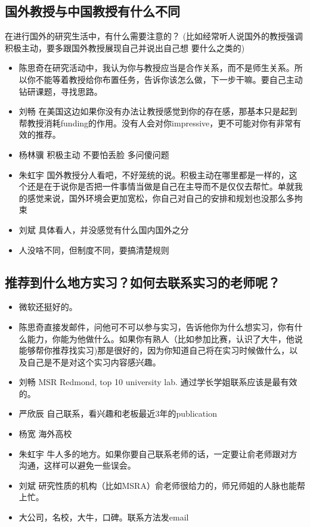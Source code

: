 \documentclass{vivid_layout}
\begin{document}
\subsection{国外教授与中国教授有什么不同}
在进行国外的研究生活中，有什么需要注意的？ (比如经常听人说国外的教授强调积极主动，要多跟国外教授展现自己并说出自己想 要什么之类的)
\begin{itemize}
\item { 陈思奇}\quad 在研究活动中，我认为你与教授应当是合作关系，而不是师生关系。所以你不能等着教授给你布置任务，告诉你该怎么做，下一步干嘛。要自己主动钻研课题，寻找思路。
\item  { 刘畅}  \quad 在美国这边如果你没有办法让教授感觉到你的存在感，那基本只是起到帮教授消耗funding的作用。没有人会对你impressive，更不可能对你有非常有效的推荐。
\item  { 杨林骥}  \quad 积极主动 不要怕丢脸 多问傻问题
\item  { 朱虹宇}  \quad 国外教授分人看吧，不好笼统的说。积极主动在哪里都是一样的，这个还是在于说你是否把一件事情当做是自己在主导而不是仅仅去帮忙。单就我的感觉来说，国外环境会更加宽松，你自己对自己的安排和规划也没那么多拘束
\item  { 刘斌}  \quad 具体看人，并没感觉有什么国内国外之分
\item 人没啥不同，但制度不同，要搞清楚规则
\end{itemize}

\subsection{推荐到什么地方实习？如何去联系实习的老师呢？}
\begin{itemize}
\item 微软还挺好的。
\item { 陈思奇}\quad 直接发邮件，问他可不可以参与实习，告诉他你为什么想实习，你有什么能力，你能为他做什么。如果你有熟人（比如参加比赛，认识了大牛，他说能够帮你推荐找实习)那是很好的，因为你知道自己将在实习时候做什么，以及自己是不是对这个实习内容感兴趣。
\item  { 刘畅}  \quad MSR Redmond, top 10 university lab. 通过学长学姐联系应该是最有效的。
\item  { 严欣辰}  \quad 自己联系，看兴趣和老板最近3年的publication
\item  { 杨宽}  \quad 海外高校
\item  { 朱虹宇}  \quad 牛人多的地方。如果你要自己联系老师的话，一定要让俞老师跟对方沟通，这样可以避免一些误会。
\item  { 刘斌}  \quad 研究性质的机构（比如MSRA）俞老师很给力的，师兄师姐的人脉也能帮上忙。 
\item 大公司，名校，大牛，口碑。联系方法发email
\end{itemize}
\end{document}
